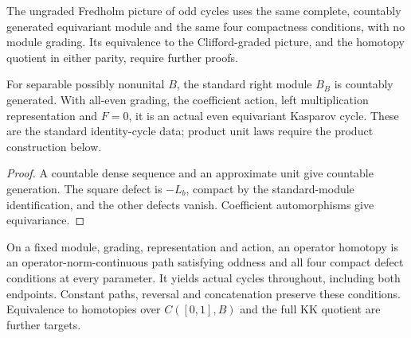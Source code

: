\begin{definition}\label{def:odd-kasparov-cycle-data}
\leanok
The ungraded Fredholm picture of odd cycles uses the same complete,
countably generated equivariant module and the same four compactness
conditions, with no module grading. Its equivalence to the Clifford-graded
picture, and the homotopy quotient in either parity, require further proofs.
\end{definition}

\begin{proposition}\label{prop:standard-identity-cycle}
\leanok
For separable possibly nonunital $B$, the standard right module $B_B$ is
countably generated. With all-even grading, the coefficient action, left
multiplication representation and $F=0$, it is an actual even equivariant
Kasparov cycle. These are the standard identity-cycle data; product unit
laws require the product construction below.
\end{proposition}
\begin{proof}\leanok
A countable dense sequence and an approximate unit give countable generation.
The square defect is $-L_b$, compact by the standard-module identification,
and the other defects vanish. Coefficient automorphisms give equivariance.
\end{proof}

\begin{definition}\label{def:fixed-module-operator-homotopy}
\leanok
On a fixed module, grading, representation and action, an operator homotopy
is an operator-norm-continuous path satisfying oddness and all four compact
defect conditions at every parameter. It yields actual cycles throughout,
including both endpoints. Constant paths, reversal and concatenation preserve
these conditions. Equivalence to homotopies over $C([0,1],B)$ and the full
KK quotient are further targets.
\end{definition}

